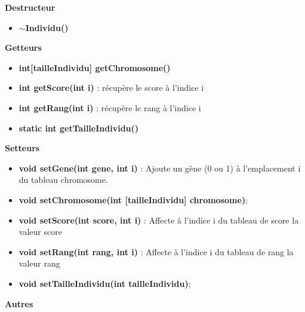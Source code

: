 \documentclass[a4paper,11pt]{article}
\begin{document}
			\textbf{Destructeur}
				\begin{itemize}
					\item \textbf{$\sim$Individu()}\\
				\end{itemize}
			\textbf{Getteurs}
					\begin{itemize}
							\item \textbf{int[tailleIndividu] getChromosome()}
							\item \textbf{int getScore(int i)} : récupère le score à l’indice i
							\item \textbf{int getRang(int i)} : récupère le rang à l’indice i
							\item \textbf{static int getTailleIndividu()}\\
					\end{itemize}
			\textbf{Setteurs}
					\begin{itemize}
							\item \textbf{void setGene(int gene, int i)} : Ajoute un gène (0 ou 1) à l’emplacement i du tableau chromosome.
							\item \textbf{void setChromosome(int [tailleIndividu] chromosome)};
							\item \textbf{void setScore(int score, int i)} : Affecte à l’indice i du tableau de score la valeur score
							\item \textbf{void setRang(int rang, int i)} : Affecte à l’indice i du tableau de rang la valeur rang
							\item \textbf{void setTailleIndividu(int tailleIndividu)};\\
					\end{itemize}
			\textbf{Autres}
\end{document}
